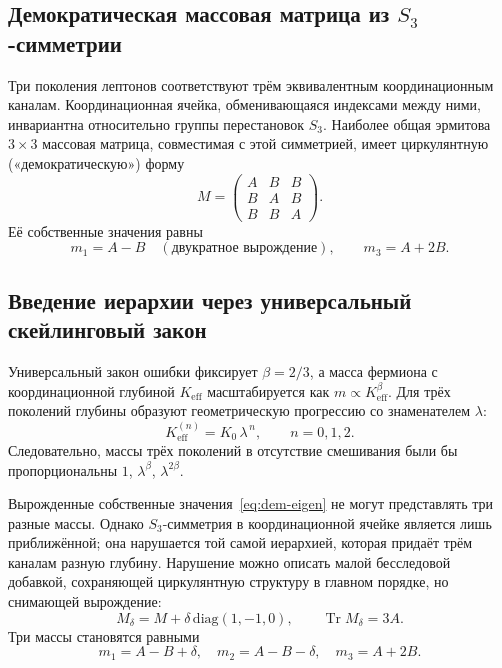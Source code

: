\documentclass[11pt,a4paper]{article}
\theoremstyle{remark}
\begin{document}
	\subsection{Демократическая массовая матрица из \(S_3\)-симметрии}
	
	Три поколения лептонов соответствуют трём эквивалентным координационным каналам. Координационная ячейка, обменивающаяся индексами между ними, инвариантна относительно группы перестановок \(S_3\). Наиболее общая эрмитова \(3\times3\) массовая матрица, совместимая с этой симметрией, имеет циркулянтную («демократическую») форму
	\begin{equation}
		M = \begin{pmatrix}
			A & B & B \\
			B & A & B \\
			B & B & A
		\end{pmatrix}.
		\label{eq:democratic}
	\end{equation}
	Её собственные значения равны
	\begin{equation}
		m_1 = A - B \quad (\text{двукратное вырождение}), \qquad
		m_3 = A + 2B .
		\label{eq:dem-eigen}
	\end{equation}
	
	\subsection{Введение иерархии через универсальный скейлинговый закон}
	
	Универсальный закон ошибки фиксирует \(\beta = 2/3\), а масса фермиона с координационной глубиной \(K_{\mathrm{eff}}\) масштабируется как \(m \propto K_{\mathrm{eff}}^{\beta}\). Для трёх поколений глубины образуют геометрическую прогрессию со знаменателем \(\lambda\):
	\[
	K_{\mathrm{eff}}^{(n)} = K_0 \, \lambda^{\,n}, \qquad n = 0,1,2 .
	\]
	Следовательно, массы трёх поколений в отсутствие смешивания были бы пропорциональны \(1\), \(\lambda^{\beta}\), \(\lambda^{2\beta}\).
	
	Вырожденные собственные значения~\eqref{eq:dem-eigen} не могут представлять три разные массы. Однако \(S_3\)-симметрия в координационной ячейке является лишь приближённой; она нарушается той самой иерархией, которая придаёт трём каналам разную глубину. Нарушение можно описать малой бесследовой добавкой, сохраняющей циркулянтную структуру в главном порядке, но снимающей вырождение:
	\begin{equation}
		M_\delta = M + \delta \,\mathrm{diag}(1,-1,0), \qquad \operatorname{Tr} M_\delta = 3A .
	\end{equation}
	Три массы становятся равными
	\begin{equation}
		m_1 = A - B + \delta, \quad
		m_2 = A - B - \delta, \quad
		m_3 = A + 2B .
		\label{eq:three-masses}
	\end{equation}
	
\end{document}
